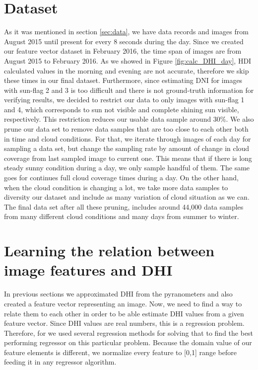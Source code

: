 \section{Dataset}
As it was mentioned in section \ref{sec:data}, we have data records and images from August 2015 until present for every 8 seconds during the day. Since we created our feature vector dataset in February 2016, the time span of images are from August 2015 to February 2016.  As we showed in Figure \ref{fig:calc_DHI_day}, HDI calculated values in the morning and evening are not accurate, therefore we skip these times in our final dataset. Furthermore, since estimating DNI for images with sun-flag 2 and 3 is too difficult and there is not ground-truth information for verifying results, we decided to restrict our data to only images with sun-flag 1 and 4, which corresponds to sun not visible and complete shining sun visible, respectively. This restriction reduces our usable data sample around 30\%. We also prune our data set to remove data samples that are too close to each other both in time and cloud conditions. For that, we iterate through images of each day for sampling a data set, but change the sampling rate by amount of change in cloud coverage from last sampled image to current one. This means that if there is long steady sunny condition during a day, we only sample handful of them. The same goes for continues full cloud coverage times during a day. On the other hand, when the cloud condition is changing a lot, we take more data samples to diversity our dataset and include as many variation of cloud situation as we can. The final data set after all these pruning, includes around 44,000 data samples from many different cloud conditions and many days from summer to winter.

\section{Learning the relation between image features and DHI}
In previous sections we approximated DHI from the pyranometers and also created a feature vector representing an image. Now, we need to find a way to relate them to each other in order to be able estimate DHI values from a given feature vector. Since DHI values are real numbers, this is a regression problem. 
Therefore, for we used several regression methods for solving that to find the best performing regressor on this particular problem. Because the domain value of our feature elements is different, we normalize every feature to [0,1] range before feeding it in any regressor algorithm. 

